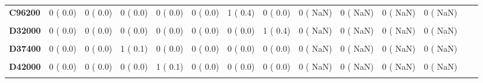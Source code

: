 \documentclass[
]{article}
\begin{document}
\begin{table}[H]
\begin{tabular}[t]{>{\raggedright\arraybackslash}p{5em}ccccccccccccc}
\textbf{C96200} & 0 (  0.0) & 0 (  0.0) & 0 (  0.0) & 0 (  0.0) & 0 (  0.0) & 1 (  0.4) & 0 (  0.0) & 0 (  NaN) & 0 (  NaN) & 0 (  NaN) & 0 (  NaN) &  & \\
\textbf{\cellcolor{gray!10}{C97000}} & \cellcolor{gray!10}{2 (  0.2)} & \cellcolor{gray!10}{1 (  0.1)} & \cellcolor{gray!10}{2 (  0.2)} & \cellcolor{gray!10}{0 (  0.0)} & \cellcolor{gray!10}{1 (  0.2)} & \cellcolor{gray!10}{0 (  0.0)} & \cellcolor{gray!10}{0 (  0.0)} & \cellcolor{gray!10}{0 (  NaN)} & \cellcolor{gray!10}{0 (  NaN)} & \cellcolor{gray!10}{0 (  NaN)} & \cellcolor{gray!10}{0 (  NaN)} & \cellcolor{gray!10}{} & \cellcolor{gray!10}{}\\
\textbf{D32000} & 0 (  0.0) & 0 (  0.0) & 0 (  0.0) & 0 (  0.0) & 0 (  0.0) & 0 (  0.0) & 1 (  0.4) & 0 (  NaN) & 0 (  NaN) & 0 (  NaN) & 0 (  NaN) &  & \\
\textbf{\cellcolor{gray!10}{D32900}} & \cellcolor{gray!10}{0 (  0.0)} & \cellcolor{gray!10}{0 (  0.0)} & \cellcolor{gray!10}{0 (  0.0)} & \cellcolor{gray!10}{0 (  0.0)} & \cellcolor{gray!10}{1 (  0.2)} & \cellcolor{gray!10}{0 (  0.0)} & \cellcolor{gray!10}{0 (  0.0)} & \cellcolor{gray!10}{0 (  NaN)} & \cellcolor{gray!10}{0 (  NaN)} & \cellcolor{gray!10}{0 (  NaN)} & \cellcolor{gray!10}{0 (  NaN)} & \cellcolor{gray!10}{} & \cellcolor{gray!10}{}\\
\textbf{D37400} & 0 (  0.0) & 0 (  0.0) & 1 (  0.1) & 0 (  0.0) & 0 (  0.0) & 0 (  0.0) & 0 (  0.0) & 0 (  NaN) & 0 (  NaN) & 0 (  NaN) & 0 (  NaN) &  & \\
\textbf{\cellcolor{gray!10}{D38200}} & \cellcolor{gray!10}{0 (  0.0)} & \cellcolor{gray!10}{0 (  0.0)} & \cellcolor{gray!10}{0 (  0.0)} & \cellcolor{gray!10}{1 (  0.1)} & \cellcolor{gray!10}{0 (  0.0)} & \cellcolor{gray!10}{0 (  0.0)} & \cellcolor{gray!10}{0 (  0.0)} & \cellcolor{gray!10}{0 (  NaN)} & \cellcolor{gray!10}{0 (  NaN)} & \cellcolor{gray!10}{0 (  NaN)} & \cellcolor{gray!10}{0 (  NaN)} & \cellcolor{gray!10}{} & \cellcolor{gray!10}{}\\
\textbf{D42000} & 0 (  0.0) & 0 (  0.0) & 0 (  0.0) & 1 (  0.1) & 0 (  0.0) & 0 (  0.0) & 0 (  0.0) & 0 (  NaN) & 0 (  NaN) & 0 (  NaN) & 0 (  NaN) &  & \\
\textbf{\cellcolor{gray!10}{D43200}} & \cellcolor{gray!10}{0 (  0.0)} & \cellcolor{gray!10}{1 (  0.1)} & \cellcolor{gray!10}{2 (  0.2)} & \cellcolor{gray!10}{0 (  0.0)} & \cellcolor{gray!10}{0 (  0.0)} & \cellcolor{gray!10}{0 (  0.0)} & \cellcolor{gray!10}{0 (  0.0)} & \cellcolor{gray!10}{0 (  NaN)} & \cellcolor{gray!10}{0 (  NaN)} & \cellcolor{gray!10}{0 (  NaN)} & \cellcolor{gray!10}{0 (  NaN)} & \cellcolor{gray!10}{} & \cellcolor{gray!10}{}\\

\end{tabular}
\end{table}
\end{document}
